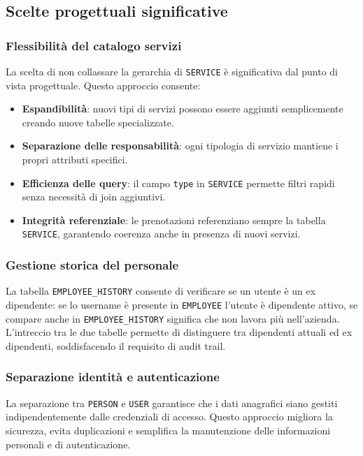 \documentclass[a4paper,12pt]{report}
\begin{document}
\subsection{Scelte progettuali significative}

\subsubsection{Flessibilità del catalogo servizi}
La scelta di non collassare la gerarchia di \texttt{SERVICE} è
significativa dal punto di vista progettuale. Questo approccio consente:

\begin{itemize}
  \item \textbf{Espandibilità}: nuovi tipi di servizi possono essere
    aggiunti semplicemente creando nuove tabelle specializzate.
  \item \textbf{Separazione delle responsabilità}: ogni tipologia di
    servizio mantiene i propri attributi specifici.
  \item \textbf{Efficienza delle query}: il campo \texttt{type} in
    \texttt{SERVICE} permette filtri rapidi senza necessità di join aggiuntivi.
  \item \textbf{Integrità referenziale}: le prenotazioni referenziano
    sempre la tabella \texttt{SERVICE}, garantendo coerenza anche in
    presenza di nuovi servizi.
\end{itemize}

\subsubsection{Gestione storica del personale}
La tabella \texttt{EMPLOYEE\_HISTORY} consente di verificare se un
utente è un ex dipendente: se lo username è presente in
\texttt{EMPLOYEE} l'utente è dipendente attivo, se compare anche in
\texttt{EMPLOYEE\_HISTORY} significa che non lavora più nell'azienda.
L'intreccio tra le due tabelle permette di distinguere tra dipendenti
attuali ed ex dipendenti, soddisfacendo il requisito di audit trail.

\subsubsection{Separazione identità e autenticazione}
La separazione tra \texttt{PERSON} e \texttt{USER} garantisce che i
dati anagrafici siano gestiti indipendentemente dalle credenziali di
accesso. Questo approccio migliora la sicurezza, evita duplicazioni e
semplifica la manutenzione delle informazioni personali e di autenticazione.
\end{document}
